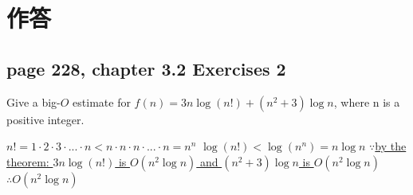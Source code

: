 \documentclass[sigconf]{acmart}
\begin{document}
\section{作答}


\subsection{page 228, chapter 3.2 Exercises 2}
\begin{shaded}
    Give a big-$O$ estimate for $f(n) = 3n \log(n!) + (n^2 + 3) \log n$, where n is a positive integer.
\end{shaded}
\uline{$n!=1\cdot2\cdot3\cdot...\cdot n < n\cdot n\cdot n\cdot...\cdot n=n^n$\newline}
\uline{$\log(n!) < \log(n^n)=n\log n$\newline}
\uline{$\because $by the theorem: $ 3n\log(n!)$ is $O(n^2\log n)$ and $(n^2 + 3) \log n$ is $O(n^2\log n)$}
\uline{$\therefore O(n^2\log n)$\newline}
\end{document}
